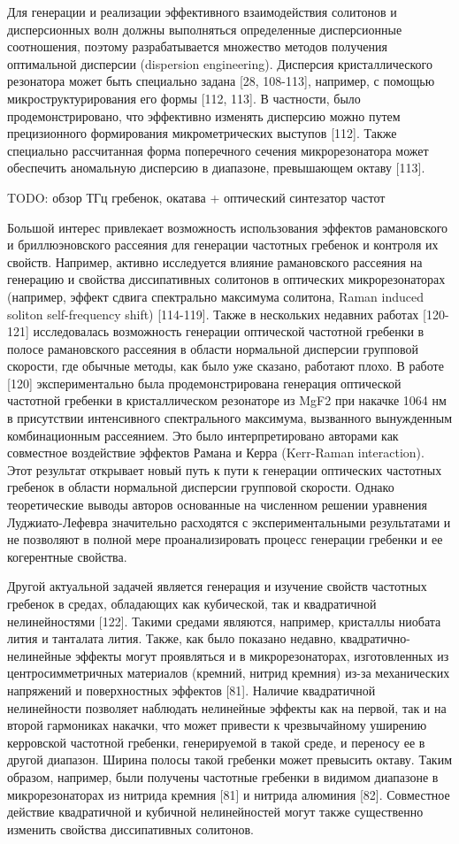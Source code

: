 Для генерации и реализации эффективного взаимодействия солитонов и дисперсионных волн должны выполняться определенные дисперсионные соотношения, поэтому разрабатывается множество методов получения оптимальной дисперсии (dispersion engineering). Дисперсия кристаллического резонатора может быть специально задана [28, 108-113], например, с помощью микроструктурирования его формы [112, 113]. В частности, было продемонстрировано, что эффективно изменять дисперсию можно путем прецизионного формирования микрометрических выступов [112]. Также специально рассчитанная форма поперечного сечения микрорезонатора может обеспечить аномальную дисперсию в диапазоне, превышающем октаву [113]. 

TODO: обзор ТГц гребенок, окатава + оптический синтезатор частот

Большой интерес привлекает возможность использования эффектов рамановского и бриллюэновского рассеяния для генерации частотных гребенок и контроля их свойств. Например, активно исследуется влияние рамановского рассеяния на генерацию и свойства диссипативных солитонов в оптических микрорезонаторах (например, эффект сдвига спектрально максимума солитона, Raman induced soliton self-frequency shift) [114-119]. Также в нескольких недавних работах [120-121] исследовалась возможность генерации оптической частотной гребенки в полосе рамановского рассеяния в области нормальной дисперсии групповой скорости, где обычные методы, как было уже сказано, работают плохо. В работе [120] экспериментально была продемонстрирована генерация оптической частотной гребенки в кристаллическом резонаторе из MgF2 при накачке 1064 нм в присутствии интенсивного спектрального максимума, вызванного вынужденным комбинационным рассеянием. Это было интерпретировано авторами как совместное воздействие эффектов Рамана и Керра (Kerr-Raman interaction). Этот результат открывает новый путь к пути к генерации оптических частотных гребенок в области нормальной дисперсии групповой скорости. Однако теоретические выводы авторов основанные на численном решении уравнения Луджиато-Лефевра значительно расходятся с экспериментальными результатами и не позволяют в полной мере проанализировать процесс генерации гребенки и ее когерентные свойства.


Другой актуальной задачей является генерация и изучение свойств частотных гребенок в средах, обладающих как кубической, так и квадратичной нелинейностями [122]. Такими средами являются, например, кристаллы ниобата лития и танталата лития. Также, как было показано недавно, квадратично-нелинейные эффекты могут проявляться и в микрорезонаторах, изготовленных из центросимметричных материалов (кремний, нитрид кремния) из-за механических напряжений и поверхностных эффектов [81]. Наличие квадратичной нелинейности позволяет наблюдать нелинейные эффекты как на первой, так и на второй гармониках накачки, что может привести к чрезвычайному уширению керровской частотной гребенки, генерируемой в такой среде, и переносу ее в другой диапазон. Ширина полосы такой гребенки может превысить октаву. Таким образом, например, были получены частотные гребенки в видимом диапазоне в микрорезонаторах из нитрида кремния [81] и нитрида алюминия [82]. Совместное действие квадратичной и кубичной нелинейностей могут также существенно изменить свойства диссипативных солитонов.


